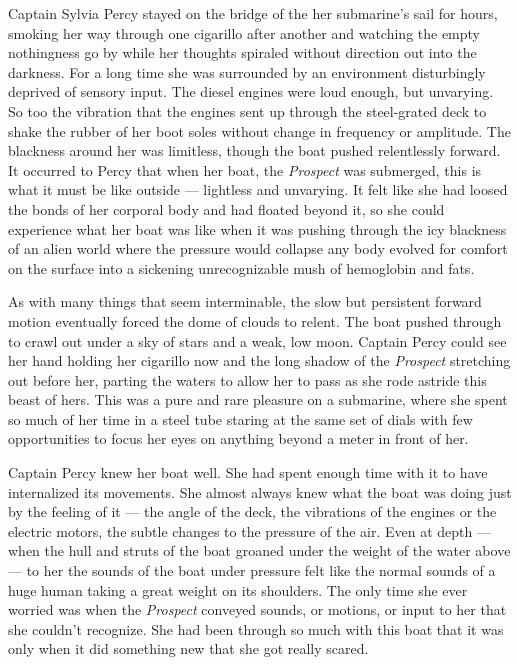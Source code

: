 \documentclass[]{article}
\begin{document}
Captain Sylvia Percy stayed on the bridge of the her submarine's sail
for hours, smoking her way through one cigarillo after another and
watching the empty nothingness go by while her thoughts spiraled without
direction out into the darkness. For a long time she was surrounded by
an environment disturbingly deprived of sensory input. The diesel
engines were loud enough, but unvarying. So too the vibration that the
engines sent up through the steel-grated deck to shake the rubber of her
boot soles without change in frequency or amplitude. The blackness
around her was limitless, though the boat pushed relentlessly forward.
It occurred to Percy that when her boat, the \emph{Prospect} was
submerged, this is what it must be like outside --- lightless and
unvarying. It felt like she had loosed the bonds of her corporal body
and had floated beyond it, so she could experience what her boat was
like when it was pushing through the icy blackness of an alien world
where the pressure would collapse any body evolved for comfort on the
surface into a sickening unrecognizable mush of hemoglobin and fats.

As with many things that seem interminable, the slow but persistent
forward motion eventually forced the dome of clouds to relent. The boat
pushed through to crawl out under a sky of stars and a weak, low moon.
Captain Percy could see her hand holding her cigarillo now and the long
shadow of the \emph{Prospect} stretching out before her, parting the
waters to allow her to pass as she rode astride this beast of hers. This
was a pure and rare pleasure on a submarine, where she spent so much of
her time in a steel tube staring at the same set of dials with few
opportunities to focus her eyes on anything beyond a meter in front of
her.

Captain Percy knew her boat well. She had spent enough time with it to
have internalized its movements. She almost always knew what the boat
was doing just by the feeling of it --- the angle of the deck, the
vibrations of the engines or the electric motors, the subtle changes to
the pressure of the air. Even at depth --- when the hull and struts of
the boat groaned under the weight of the water above --- to her the
sounds of the boat under pressure felt like the normal sounds of a huge
human taking a great weight on its shoulders. The only time she ever
worried was when the \emph{Prospect} conveyed sounds, or motions, or
input to her that she couldn't recognize. She had been through so much
with this boat that it was only when it did something new that she got
really scared.
\end{document}
